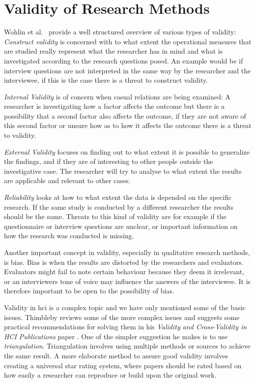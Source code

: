 \section{Validity of Research Methods}
\label{subsec:threatsValidity}
Wohlin et al.~\cite{experiment} provide a well structured overview of various types of validity:
\textit{Construct validity} is concerned with to what extent the operational measures that are studied really represent what the researcher has in mind and what is investigated according to the research questions posed. An example would be if interview questions are not interpreted in the same way by the researcher and the interviewee, if this is the case there is a threat to construct validity.

\textit{Internal Validity} is of concern when casual relations are being examined: A researcher is investigating how a factor affects the outcome but there is a possibility that a second factor also affects the outcome, if they are not aware of this second factor or unsure how as to how it affects the outcome there is a threat to validity.

\textit{External Validity} focuses on finding out to what extent it is possible to generalize the findings, and if they are of interesting to other people outside the investigative case. The researcher will try to analyse to what extent the results are applicable and relevant to other cases.

\textit{Reliability} looks at how to what extent the data is depended on the specific research. If the same study is conducted by a different researcher the results should be the same. Threats to this kind of validity are for example if the questionnaire or interview questions are unclear, or important information on how the research was conducted is missing.


Another important concept in validity, especially in qualitative research methods, is bias. Bias is when the results are distorted by the researchers and evaluators. Evaluators might fail to note certain behaviour because they deem it irrelevant, or an interviewers tone of voice may influence the answers of the interviewee. It is therefore important to be open to the possibility of bias.

Validity in \gls{hci} is a complex topic and we have only mentioned some of the basic issues. Thimbleby reviews some of the more complex issues and suggests some practical recommendations for solving them in his \textit{Validity and Cross-Validity in HCI Publications} paper \cite{validation}. One of the simpler suggestion he makes is to use \emph{triangulation}. Triangulation involves using multiple methods or sources to achieve the same result. A more elaborate method to assure good validity involves creating a universal star rating system, where papers should be rated based on how easily a researcher can reproduce or build upon the original work.
